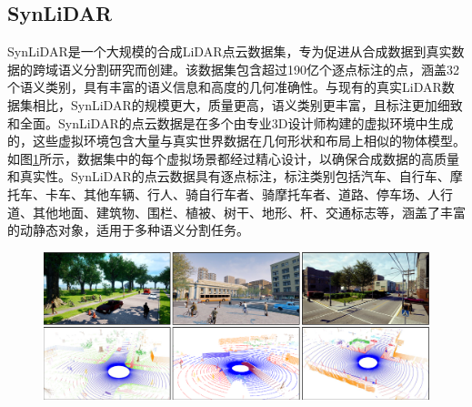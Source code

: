 \subsection{SynLiDAR}
SynLiDAR是一个大规模的合成LiDAR点云数据集，专为促进从合成数据到真实数据的跨域语义分割研究而创建。该数据集包含超过190亿个逐点标注的点，涵盖32个语义类别，具有丰富的语义信息和高度的几何准确性。与现有的真实LiDAR数据集相比，SynLiDAR的规模更大，质量更高，语义类别更丰富，且标注更加细致和全面。SynLiDAR的点云数据是在多个由专业3D设计师构建的虚拟环境中生成的，这些虚拟环境包含大量与真实世界数据在几何形状和布局上相似的物体模型。如图\ref{fig:2-4}所示，数据集中的每个虚拟场景都经过精心设计，以确保合成数据的高质量和真实性。SynLiDAR的点云数据具有逐点标注，标注类别包括汽车、自行车、摩托车、卡车、其他车辆、行人、骑自行车者、骑摩托车者、道路、停车场、人行道、其他地面、建筑物、围栏、植被、树干、地形、杆、交通标志等，涵盖了丰富的动静态对象，适用于多种语义分割任务。
\vspace{-0.1cm}
\begin{figure}[h]
    \centering
    \includegraphics[width = \textwidth, scale=0.5]{ljx/figure/2-5/synlidar.png}
    \label{fig:2-4}
\end{figure}
\vspace{-0.35cm} 
